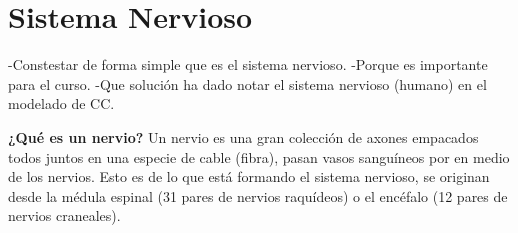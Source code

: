 \section{Sistema Nervioso}

-Constestar de forma simple que es el sistema nervioso.
-Porque es importante para el curso.
-Que solución ha dado notar el sistema nervioso (humano) en el modelado de CC.




\textbf{¿Qué es un nervio?}
Un nervio es una gran colección de axones empacados todos juntos en una especie de cable (fibra), pasan vasos sanguíneos por en medio de los nervios. Esto es de lo que está formando el sistema nervioso, se originan desde la médula espinal (31 pares de nervios raquídeos) o el encéfalo (12 pares de nervios craneales).






